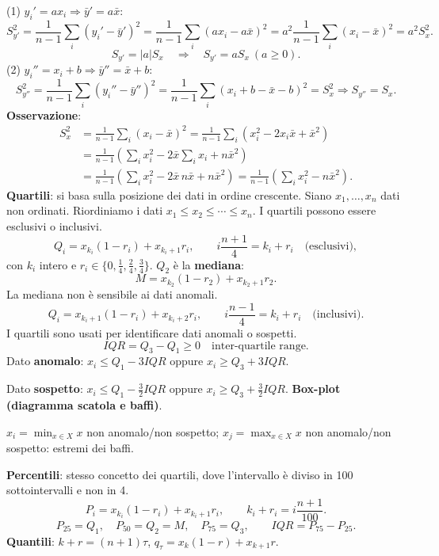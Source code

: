 \documentclass[11pt,a4paper]{article}
\newcommand{\pagina}[1]{\clearpage}
\begin{document}
(1) $y_i'=ax_i\Rightarrow\bar y'=a\bar x$:
\[S_{y'}^2=\frac1{n-1}\sum_i(y_i'-\bar y')^2=\frac1{n-1}\sum_i(ax_i-a\bar x)^2=a^2\frac1{n-1}\sum_i(x_i-\bar x)^2=a^2S_x^2.\]
\[S_{y'}=|a|S_x\quad\Rightarrow\quad S_{y'}=aS_x\ (a\ge0).\]
(2) $y_i''=x_i+b\Rightarrow\bar y''=\bar x+b$:
\[S_{y''}^2=\frac1{n-1}\sum_i(y_i''-\bar y'')^2=\frac1{n-1}\sum_i(x_i+b-\bar x-b)^2=S_x^2\Rightarrow S_{y''}=S_x.\]
\pagina{7}\textbf{Osservazione}:
\begin{align*}S_x^2&=\frac1{n-1}\sum_i(x_i-\bar x)^2=\frac1{n-1}\sum_i(x_i^2-2x_i\bar x+\bar x^2)\\&=\frac1{n-1}\left(\sum_i x_i^2-2\bar x\sum_i x_i+n\bar x^2\right)\\&=\frac1{n-1}\left(\sum_i x_i^2-2\bar x\,n\bar x+n\bar x^2\right)=\boxed{\frac1{n-1}\left(\sum_i x_i^2-n\bar x^2\right)}.\end{align*}
\textbf{Quartili}: si basa sulla posizione dei dati in ordine crescente. Siano $x_1,\ldots,x_n$ dati non ordinati. Riordiniamo i dati $x_1\le x_2\le\cdots\le x_n$. I quartili possono essere esclusivi o inclusivi.
\[\boxed{Q_i=x_{k_i}(1-r_i)+x_{k_i+1}r_i},\qquad i\frac{n+1}{4}=k_i+r_i\quad\text{(esclusivi)},\]
con $k_i$ intero e $r_i\in\{0,\frac14,\frac24,\frac34\}$. $Q_2$ è la \textbf{mediana}:
\[M=x_{k_2}(1-r_2)+x_{k_2+1}r_2.\]
La mediana non è sensibile ai dati anomali.
\[\boxed{Q_i=x_{k_i+1}(1-r_i)+x_{k_i+2}r_i},\qquad i\frac{n-1}{4}=k_i+r_i\quad\text{(inclusivi)}.\]
I quartili sono usati per identificare dati anomali o sospetti.
\[\boxed{IQR=Q_3-Q_1\ge0}\quad\text{inter-quartile range}.\]
Dato \textbf{anomalo}: $x_i\le Q_1-3IQR$ oppure $x_i\ge Q_3+3IQR$.

Dato \textbf{sospetto}: $x_i\le Q_1-\frac32 IQR$ oppure $x_i\ge Q_3+\frac32 IQR$.
\pagina{8}\textbf{Box-plot (diagramma scatola e baffi)}.
\begin{center}\end{center}
$x_i=\min_{x\in X}x$ non anomalo/non sospetto; $x_j=\max_{x\in X}x$ non anomalo/non sospetto: estremi dei baffi.

\textbf{Percentili}: stesso concetto dei quartili, dove l'intervallo è diviso in 100 sottointervalli e non in 4.
\[\boxed{P_i=x_{k_i}(1-r_i)+x_{k_i+1}r_i},\qquad k_i+r_i=i\frac{n+1}{100}.\]
\[P_{25}=Q_1,\quad P_{50}=Q_2=M,\quad P_{75}=Q_3,\qquad IQR=P_{75}-P_{25}.\]
\textbf{Quantili}: $k+r=(n+1)\tau$, $q_\tau=x_k(1-r)+x_{k+1}r$.
\end{document}
